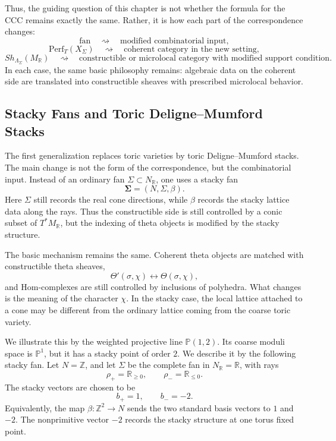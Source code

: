 Thus, the guiding question of this chapter is not whether the formula for the
CCC remains exactly the same. Rather, it is how each part of the correspondence
changes:
\[
\text{fan}
\quad\rightsquigarrow\quad
\text{modified combinatorial input},
\]
\[
\mathrm{Perf}_T(X_\Sigma)
\quad\rightsquigarrow\quad
\text{coherent category in the new setting},
\]
\[
Sh_{\Lambda_\Sigma}(M_{\mathbb R})
\quad\rightsquigarrow\quad
\text{constructible or microlocal category with modified support condition}.
\]
In each case, the same basic philosophy remains: algebraic data on the coherent
side are translated into constructible sheaves with prescribed microlocal
behavior.


\subsection{Stacky Fans and Toric Deligne--Mumford Stacks}

The first generalization replaces toric varieties by toric Deligne--Mumford
stacks. The main change is not the form of the correspondence, but the
combinatorial input. Instead of an ordinary fan \(\Sigma\subset N_{\mathbb R}\),
one uses a stacky fan
\[
\boldsymbol\Sigma=(N,\Sigma,\beta).
\]
Here \(\Sigma\) still records the real cone directions, while \(\beta\) records
the stacky lattice data along the rays. Thus the constructible side is still
controlled by a conic subset of \(T^*M_{\mathbb R}\), but the indexing of theta
objects is modified by the stacky structure.

The basic mechanism remains the same. Coherent theta objects are matched with
constructible theta sheaves,
\[
\Theta'(\sigma,\chi)\longleftrightarrow \Theta(\sigma,\chi),
\]
and Hom-complexes are still controlled by inclusions of polyhedra. What changes
is the meaning of the character \(\chi\). In the stacky case, the local lattice
attached to a cone may be different from the ordinary lattice coming from the
coarse toric variety.

We illustrate this by the weighted projective line \(\mathbb P(1,2)\). Its
coarse moduli space is \(\mathbb P^1\), but it has a stacky point of order
\(2\). We describe it by the following stacky fan. Let \(N=\mathbb Z\), and let
\(\Sigma\) be the complete fan in \(N_{\mathbb R}=\mathbb R\), with rays
\[
\rho_+=\mathbb R_{\ge 0},
\qquad
\rho_-=\mathbb R_{\le 0}.
\]
The stacky vectors are chosen to be
\[
b_+=1,\qquad b_-=-2.
\]
Equivalently, the map \(\beta:\mathbb Z^2\to N\) sends the two standard basis
vectors to \(1\) and \(-2\). The nonprimitive vector \(-2\) records the stacky
structure at one torus fixed point.

